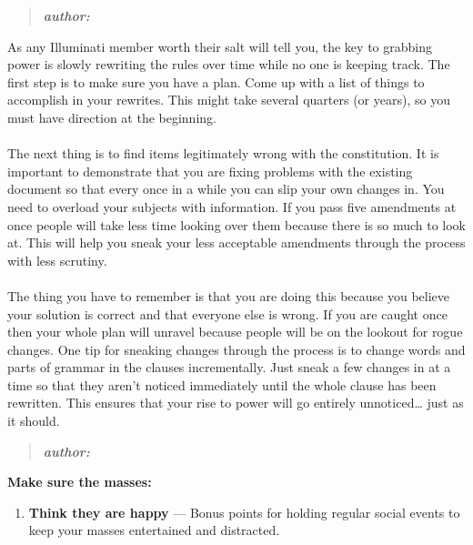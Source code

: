 \documentclass[9pt]{extarticle}
\begin{document}
\begin{minipage}[t]{.61\linewidth} %
\vspace{-0.4cm}
\hypertarget{firstnews}{}
\begin{quote}
\centering
\textbf{\textit{author: }}
\end{quote}

As any Illuminati member worth their salt will tell you, the key to grabbing 
power is slowly rewriting the rules over time while no one is keeping track. 
The first step is to make sure you have a plan. Come up with a list of things 
to accomplish in your rewrites. This might take several quarters (or years), 
so you must have direction at the beginning.  \\
\\
The next thing is to find items legitimately wrong with the constitution. It is important to demonstrate that you are fixing problems with the existing 
document so that every once in a while you can slip your own changes in. 
You need to overload your subjects with information. If you pass five 
amendments at once people will take less time looking over them because there
is so much to look at. This will help you sneak your less acceptable amendments
through the process with less scrutiny. \\
\\
The thing you have to remember is that you are doing this because you believe
your solution is correct and that everyone else is wrong. If you are caught 
once then your whole plan will unravel because people will be on the lookout for rogue changes. One tip for sneaking changes through the process is to change words
and parts of grammar in the clauses incrementally. Just sneak a few changes in 
at a time so that they aren't noticed immediately until the whole clause has 
been rewritten. This ensures that your rise to power will go entirely 
unnoticed… just as it should.


\hypertarget{secondnews}{} 
\begin{quote}
\centering
\textbf{\textit{author: }}
\end{quote}

\textbf{Make sure the masses:}
\begin{enumerate}
\item \textbf{Think they are happy} — Bonus points for holding regular 
social events to keep your masses entertained and distracted.


\end{enumerate}
\end{minipage}
\end{document}
